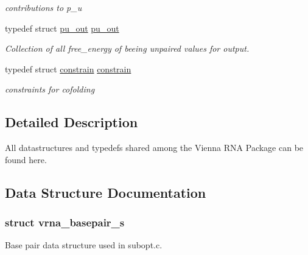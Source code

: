 \begin{DoxyCompactItemize}
\begin{DoxyCompactList}\small\item\em contributions to p\-\_\-u \end{DoxyCompactList}\item 
\hypertarget{group__data__structures_ga501763bd204b60f40e3ab68b40023023}{typedef struct \hyperlink{group__data__structures_structpu__out}{pu\-\_\-out} \hyperlink{group__data__structures_ga501763bd204b60f40e3ab68b40023023}{pu\-\_\-out}}\label{group__data__structures_ga501763bd204b60f40e3ab68b40023023}

\begin{DoxyCompactList}\small\item\em Collection of all free\-\_\-energy of beeing unpaired values for output. \end{DoxyCompactList}\item 
\hypertarget{group__data__structures_ga212e3afb0cc299acdfb1ec976435686e}{typedef struct \hyperlink{group__data__structures_structconstrain}{constrain} \hyperlink{group__data__structures_ga212e3afb0cc299acdfb1ec976435686e}{constrain}}\label{group__data__structures_ga212e3afb0cc299acdfb1ec976435686e}

\begin{DoxyCompactList}\small\item\em constraints for cofolding \end{DoxyCompactList}\end{DoxyCompactItemize}


\subsection{Detailed Description}
All datastructures and typedefs shared among the Vienna R\-N\-A Package can be found here. 

\subsection{Data Structure Documentation}
\label{structvrna__basepair__s}
\hypertarget{group__data__structures_structvrna__basepair__s}{}
\subsubsection{struct vrna\-\_\-basepair\-\_\-s}
Base pair data structure used in subopt.\-c. \label{structvrna__plist__s}
\hypertarget{group__data__structures_structvrna__plist__s}{}
